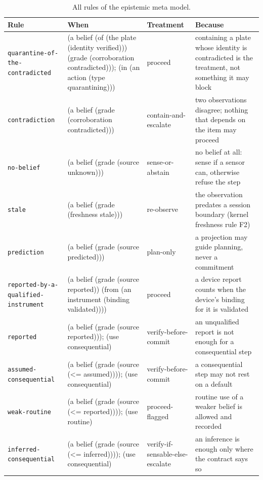 \documentclass[10pt,a4paper]{article}
\begin{document}
\begin{table}[tbp]\centering\footnotesize
\caption{All rules of the epistemic meta model.}\label{tab:meta}
\begin{tabularx}{\linewidth}{p{3.0cm}XlX}\toprule
\textbf{Rule} & \textbf{When} & \textbf{Treatment} & \textbf{Because} \\\midrule
\texttt{quarantine-\allowbreak{}of-\allowbreak{}the-\allowbreak{}contradicted} & (a belief (of (the plate (identity verified))) (grade (corroboration contradicted))); (in (an action (type quarantining))) & proceed & containing a plate whose identity is contradicted is the treatment, not something it may block \\
\texttt{contradiction} & (a belief (grade (corroboration contradicted))) & contain-and-escalate & two observations disagree; nothing that depends on the item may proceed \\
\texttt{no-\allowbreak{}belief} & (a belief (grade (source unknown))) & sense-or-abstain & no belief at all: sense if a sensor can, otherwise refuse the step \\
\texttt{stale} & (a belief (grade (freshness stale))) & re-observe & the observation predates a session boundary (kernel freshness rule F2) \\
\texttt{prediction} & (a belief (grade (source predicted))) & plan-only & a projection may guide planning, never a commitment \\
\texttt{reported-\allowbreak{}by-\allowbreak{}a-\allowbreak{}qualified-\allowbreak{}instrument} & (a belief (grade (source reported)) (from (an instrument (binding validated)))) & proceed & a device report counts when the device's binding for it is validated \\
\texttt{reported} & (a belief (grade (source reported))); (use consequential) & verify-before-commit & an unqualified report is not enough for a consequential step \\
\texttt{assumed-\allowbreak{}consequential} & (a belief (grade (source (<= assumed)))); (use consequential) & verify-before-commit & a consequential step may not rest on a default \\
\texttt{weak-\allowbreak{}routine} & (a belief (grade (source (<= reported)))); (use routine) & proceed-flagged & routine use of a weaker belief is allowed and recorded \\
\texttt{inferred-\allowbreak{}consequential} & (a belief (grade (source (<= inferred)))); (use consequential) & verify-if-sensable-else-escalate & an inference is enough only where the contract says so \\\bottomrule
\end{tabularx}
\end{table}
\end{document}

